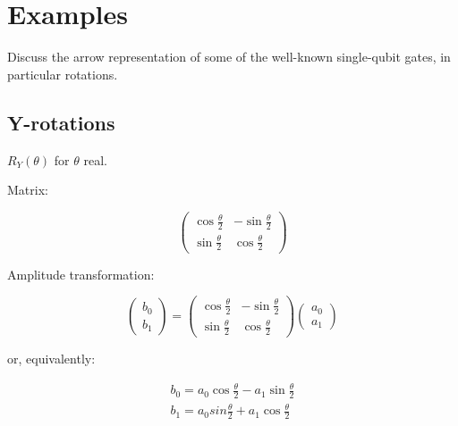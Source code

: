 \documentclass[11pt, letterpaper]{article}
\begin{document}
\section{Examples}
\label{sec:examples}
Discuss the arrow representation of some of the well-known single-qubit gates, in particular rotations.

\newpage

\subsection{Y-rotations}
$R_Y(\theta)$ for $\theta$ real.

Matrix:

\begin{equation}
	\begin{pmatrix} \cos\frac{\theta}{2} & -\sin\frac{\theta}{2}\\  \sin\frac{\theta}{2} &  \cos\frac{\theta}{2} \end{pmatrix}
\end{equation}

Amplitude transformation:

\begin{equation}
	\begin{pmatrix}b_0 \\ b_1 \end{pmatrix} =
	\begin{pmatrix} \cos\frac{\theta}{2} & -\sin\frac{\theta}{2}\\  \sin\frac{\theta}{2} &  \cos\frac{\theta}{2} \end{pmatrix}
	\begin{pmatrix} a_0 \\ a_1 \end{pmatrix}
\end{equation}

or, equivalently:

\begin{eqnarray*}
	 b_0 = a_0\cos\frac{\theta}{2} - a_1\sin\frac{\theta}{2} \\
	 b_1 = a_0sin\frac{\theta}{2} + a_1\cos\frac{\theta}{2}
\end{eqnarray*}
\end{document}
